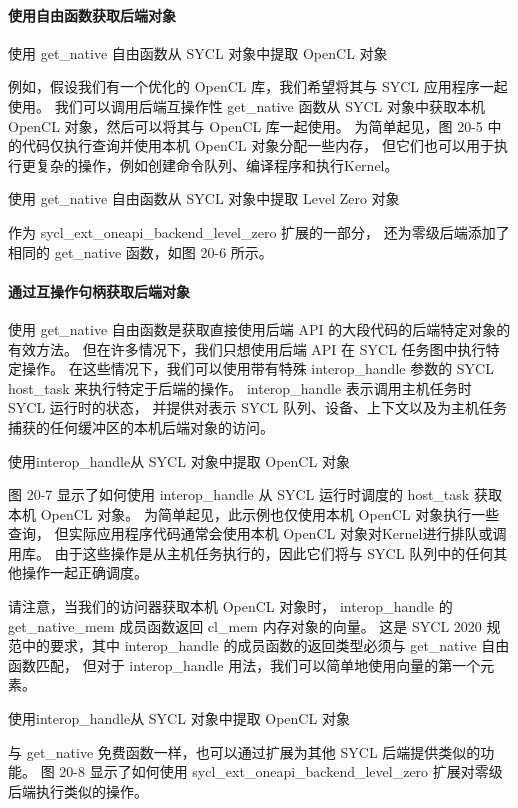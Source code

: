 \paragraph{使用自由函数获取后端对象}

{\color{red} 使用 get\_native 自由函数从 SYCL 对象中提取 OpenCL 对象}

例如，假设我们有一个优化的 OpenCL 库，我们希望将其与 SYCL 应用程序一起使用。 
我们可以调用后端互操作性 get\_native 函数从 SYCL 对象中获取本机 OpenCL 对象，然后可以将其与 OpenCL 库一起使用。 
为简单起见，图 20-5 中的代码仅执行查询并使用本机 OpenCL 对象分配一些内存，
但它们也可以用于执行更复杂的操作，例如创建命令队列、编译程序和执行Kernel。

{\color{red} 使用 get\_native 自由函数从 SYCL 对象中提取 Level Zero 对象}

作为 sycl\_ext\_oneapi\_backend\_level\_zero 扩展的一部分，
还为零级后端添加了相同的 get\_native 函数，如图 20-6 所示。

\paragraph{通过互操作句柄获取后端对象}

使用 get\_native 自由函数是获取直接使用后端 API 的大段代码的后端特定对象的有效方法。 
但在许多情况下，我们只想使用后端 API 在 SYCL 任务图中执行特定操作。 
在这些情况下，我们可以使用带有特殊 interop\_handle 参数的 SYCL host\_task 来执行特定于后端的操作。 
interop\_handle 表示调用主机任务时 SYCL 运行时的状态，
并提供对表示 SYCL 队列、设备、上下文以及为主机任务捕获的任何缓冲区的本机后端对象的访问。

{\color{red} 使用interop\_handle从 SYCL 对象中提取 OpenCL 对象}

图 20-7 显示了如何使用 interop\_handle 从 SYCL 运行时调度的 host\_task 获取本机 OpenCL 对象。 
为简单起见，此示例也仅使用本机 OpenCL 对象执行一些查询，
但实际应用程序代码通常会使用本机 OpenCL 对象对Kernel进行排队或调用库。 
由于这些操作是从主机任务执行的，因此它们将与 SYCL 队列中的任何其他操作一起正确调度。

请注意，当我们的访问器获取本机 OpenCL 对象时，
interop\_handle 的 get\_native\_mem 成员函数返回 cl\_mem 内存对象的向量。 
这是 SYCL 2020 规范中的要求，其中 interop\_handle 的成员函数的返回类型必须与 get\_native 自由函数匹配，
但对于 interop\_handle 用法，我们可以简单地使用向量的第一个元素。

{\color{red} 使用interop\_handle从 SYCL 对象中提取 OpenCL 对象}

与 get\_native 免费函数一样，也可以通过扩展为其他 SYCL 后端提供类似的功能。 
图 20-8 显示了如何使用 sycl\_ext\_oneapi\_backend\_level\_zero 扩展对零级后端执行类似的操作。

